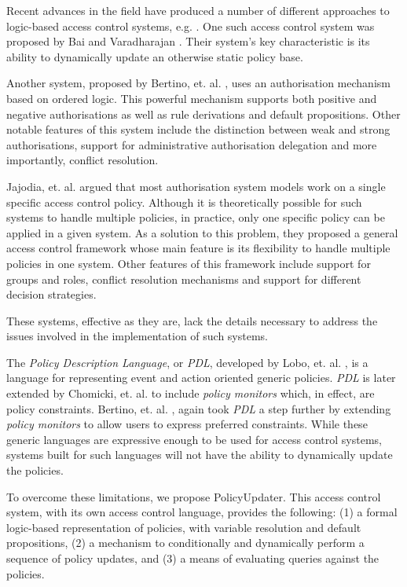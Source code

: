 \documentclass[glov2,twocolumn,final]{svjour2}
\begin{document}
    Recent advances in the field have produced a number of different approaches
    to logic-based access control systems, e.g. \cite{HAL,LI}. One such
    access control system was proposed by Bai and Varadharajan \cite{BA1,BA2}.
    Their system's key characteristic is its ability to dynamically update an
    otherwise static policy base.

    Another system, proposed by Bertino, et. al. \cite{BE1}, uses an
    authorisation mechanism based on ordered logic. This powerful mechanism
    supports both positive and negative authorisations as well as rule
    derivations and default propositions. Other notable features of this system
    include the distinction between weak and strong authorisations, support
    for administrative authorisation delegation and more importantly, conflict
    resolution.

    Jajodia, et. al. \cite{JAJ} argued that most authorisation system models
    work on a single specific access control policy. Although it is
    theoretically possible for such systems to handle multiple policies, in
    practice, only one specific policy can be applied in a given system. As
    a solution to this problem, they proposed a general access control
    framework whose main feature is its flexibility to handle multiple
    policies in one system. Other features of this framework include support
    for groups and roles, conflict resolution mechanisms and support for
    different decision strategies.

    These systems, effective as they are, lack the details necessary to address
    the issues involved in the implementation of such systems.

    The {\em Policy Description Language}, or {\em PDL}, developed by Lobo,
    et. al. \cite{LOB}, is a language for representing event and action
    oriented generic policies. {\em PDL} is later extended by Chomicki, et. al.
    \cite{CHO} to include {\em policy monitors} which, in effect, are policy
    constraints. Bertino, et. al. \cite{BE2}, again took {\em PDL} a step
    further by extending {\em policy monitors} to allow users to express
    preferred constraints. While these generic languages are expressive enough
    to be used for access control systems, systems built for such languages
    will not have the ability to dynamically update the policies.

    To overcome these limitations, we propose PolicyUpdater. This access
    control system, with its own access control language, provides the
    following: (1) a formal logic-based representation of policies, with
    variable resolution and default propositions, (2) a mechanism to
    conditionally and dynamically perform a sequence of policy updates, and (3)
    a means of evaluating queries against the policies.
\end{document}
